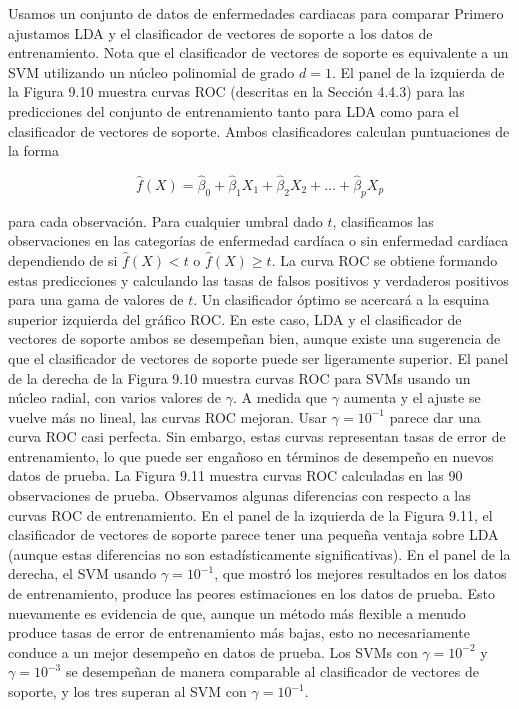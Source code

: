 \begin{example}
Usamos un conjunto de datos de enfermedades cardiacas para comparar 
Primero ajustamos LDA y el clasificador de vectores de soporte a los datos de entrenamiento.
Nota que el clasificador de vectores de soporte es equivalente a un SVM utilizando un núcleo polinomial de grado $d = 1$.
El panel de la izquierda de la Figura 9.10 muestra curvas ROC (descritas en la Sección 4.4.3) para las predicciones del conjunto de entrenamiento tanto para LDA como para el clasificador de vectores de soporte.
Ambos clasificadores calculan puntuaciones de la forma

\begin{equation}
\hat{f}(X) = \hat{\beta}_0 + \hat{\beta}_1 X_1 + \hat{\beta}_2 X_2 + \dots + \hat{\beta}_p X_p
\end{equation}

\noindent para cada observación. Para cualquier umbral dado $t$, clasificamos las observaciones en las categorías de enfermedad cardíaca o sin enfermedad cardíaca dependiendo de si $\hat{f}(X) < t$ o $\hat{f}(X) \geq t$.
La curva ROC se obtiene formando estas predicciones y calculando las tasas de falsos positivos y verdaderos positivos para una gama de valores de $t$.
Un clasificador óptimo se acercará a la esquina superior izquierda del gráfico ROC.
En este caso, LDA y el clasificador de vectores de soporte ambos se desempeñan bien, aunque existe una sugerencia de que el clasificador de vectores de soporte puede ser ligeramente superior.
El panel de la derecha de la Figura 9.10 muestra curvas ROC para SVMs usando un núcleo radial, con varios valores de $\gamma$.
A medida que $\gamma$ aumenta y el ajuste se vuelve más no lineal, las curvas ROC mejoran.
Usar $\gamma = 10^{-1}$ parece dar una curva ROC casi perfecta.
Sin embargo, estas curvas representan tasas de error de entrenamiento, lo que puede ser engañoso en términos de desempeño en nuevos datos de prueba.
La Figura 9.11 muestra curvas ROC calculadas en las 90 observaciones de prueba.
Observamos algunas diferencias con respecto a las curvas ROC de entrenamiento.
En el panel de la izquierda de la Figura 9.11, el clasificador de vectores de soporte parece tener una pequeña ventaja sobre LDA (aunque estas diferencias no son estadísticamente significativas).
En el panel de la derecha, el SVM usando $\gamma = 10^{-1}$, que mostró los mejores resultados en los datos de entrenamiento, produce las peores estimaciones en los datos de prueba.
Esto nuevamente es evidencia de que, aunque un método más flexible a menudo produce tasas de error de entrenamiento más bajas, esto no necesariamente conduce a un mejor desempeño en datos de prueba.
Los SVMs con $\gamma = 10^{-2}$ y $\gamma = 10^{-3}$ se desempeñan de manera comparable al clasificador de vectores de soporte, y los tres superan al SVM con $\gamma = 10^{-1}$.
\end{example}





